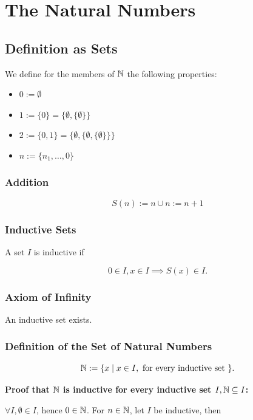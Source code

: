 \chapter{The Natural Numbers}

\section{Definition as Sets}

We define for the members of \(\mathbb{N}\) the following properties:

\begin{itemize}
	\item \(0 := \emptyset\)
	\item \(1:= \{0\} = \{\emptyset, \{\emptyset\}\}\)
	\item \(2:= \{0, 1\} = \{\emptyset, \{\emptyset, \{\emptyset\}\}\}\)
	\item \(n:= \{n_1, \dots, 0\}\)
\end{itemize}

\subsection{Addition}

\[
	S(n) := n \cup {n} := n + 1
\]

\subsection{Inductive Sets}

A set \(I\) is inductive if

\[
	0 \in I, x \in I \implies S(x) \in I.
\]

\subsection{Axiom of Infinity}

An inductive set exists.

\subsection{Definition of the Set of Natural Numbers}

\[
	\mathbb{N} := \{x \mid x \in I, \text{ for every inductive set }\}.
\]

\textbf{Proof that \(\mathbb{N}\) is inductive for every inductive set \(I, \mathbb{N} \subseteq I\):}

\(\forall I, \emptyset \in I\), hence \(0 \in \mathbb{N}\). For \(n \in \mathbb{N}\), let \(I\) be inductive, then 

